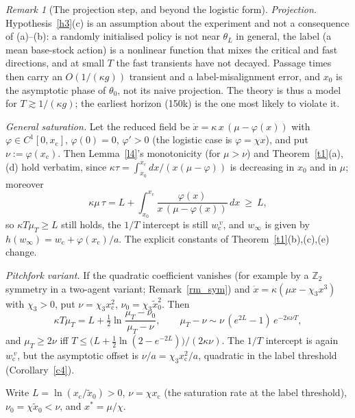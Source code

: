 \documentclass[11pt]{article}
\theoremstyle{definition}
\theoremstyle{remark}
\newtheorem{remark}{Remark}
\newcommand{\wcrit}{w_{\mathrm c}}
\newcommand{\xc}{x_{\mathrm c}}
\newcommand{\xmed}{\tilde x_0}
\begin{document}
\begin{remark}[The projection step, and beyond the logistic form]\label{rm_beyond}
\emph{Projection.} Hypothesis~\ref{h3}(c) is an assumption about the experiment and not a consequence of (a)--(b): a randomly initialised policy is not near $\theta_L$ in general, the label (a mean base-stock action) is a nonlinear function that mixes the critical and fast directions, and at small $T$ the fast transients have not decayed. Passage times then carry an $O(1/(\kappa g))$ transient and a label-misalignment error, and $x_0$ is the asymptotic phase of $\theta_0$, not its naive projection. The theory is thus a model for $T\gtrsim1/(\kappa g)$; the earliest horizon (150k) is the one most likely to violate it.

\emph{General saturation.} Let the reduced field be $\dot x=\kappa\,x\,(\mu-\varphi(x))$ with $\varphi\in C^1[0,\xc]$, $\varphi(0)=0$, $\varphi'>0$ (the logistic case is $\varphi=\chi x$), and put $\nu:=\varphi(\xc)$. Then Lemma~\ref{l4}'s monotonicity (for $\mu>\nu$) and Theorem~\ref{t1}(a),(d) hold verbatim, since $\kappa\tau=\int_{x_0}^{\xc}dx/(x(\mu-\varphi))$ is decreasing in $x_0$ and in $\mu$; moreover
\[
\kappa\mu\,\tau=L+\int_{x_0}^{\xc}\frac{\varphi(x)}{x\,(\mu-\varphi(x))}\,dx\ \ge\ L,
\]
so $\kappa T\mu_T\ge L$ still holds, the $1/T$ intercept is still $\wcrit^{\,v}$, and $w_\infty$ is given by $h(w_\infty)=\wcrit+\varphi(\xc)/a$. The explicit constants of Theorem~\ref{t1}(b),(c),(e) change.

\emph{Pitchfork variant.} If the quadratic coefficient vanishes (for example by a $\mathbb Z_2$ symmetry in a two-agent variant; Remark~\ref{rm_sym}) and $\dot x=\kappa(\mu x-\chi_3x^3)$ with $\chi_3>0$, put $\nu=\chi_3\xc^2$, $\nu_0=\chi_3\xmed^2$. Then
\[
\kappa T\mu_T=L+\tfrac12\ln\frac{\mu_T-\nu_0}{\mu_T-\nu},\qquad \mu_T-\nu\sim\nu\,(e^{2L}-1)\,e^{-2\kappa\nu T},
\]
and $\mu_T\ge2\nu$ iff $T\le\big(L+\tfrac12\ln(2-e^{-2L})\big)/(2\kappa\nu)$.
The $1/T$ intercept is again $\wcrit^{\,v}$, but the asymptotic offset is $\nu/a=\chi_3\xc^2/a$, quadratic in the label threshold (Corollary~\ref{c4}).
\end{remark}

Write $L=\ln(\xc/\xmed)>0$, $\nu=\chi\xc$ (the saturation rate at the label threshold), $\nu_0=\chi\xmed<\nu$, and $x^*=\mu/\chi$.
\end{document}
